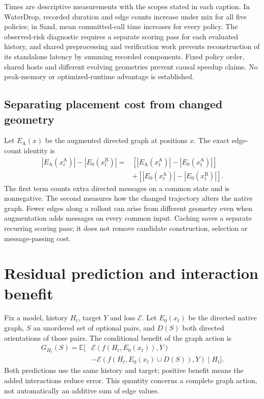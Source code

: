 Times are descriptive measurements with the scopes stated in each caption. In WaterDrop, recorded duration and edge counts increase under mix for all five policies; in Sand, mean committed-call time increases for every policy. The observed-risk diagnostic requires a separate scoring pass for each evaluated history, and shared preprocessing and verification work prevents reconstruction of its standalone latency by summing recorded components. Fixed policy order, shared hosts and different evolving geometries prevent causal speedup claims. No peak-memory or optimized-runtime advantage is established.

\subsection{Separating placement cost from changed geometry}
Let $E_{\mathrm A}(x)$ be the augmented directed graph at positions $x$. The exact edge-count identity is
\begin{align}
 |E_{\mathrm A}(x_t^{\mathrm A})|-|E_0(x_t^{\mathrm B})|
 ={}&[|E_{\mathrm A}(x_t^{\mathrm A})|-|E_0(x_t^{\mathrm A})|]\nonumber\\
 &+[|E_0(x_t^{\mathrm A})|-|E_0(x_t^{\mathrm B})|].
 \label{eq:decomposition}
\end{align}
The first term counts extra directed messages on a common state and is nonnegative. The second measures how the changed trajectory alters the native graph. Fewer edges along a rollout can arise from different geometry even when augmentation adds messages on every common input. Caching saves a separate recurring scoring pass; it does not remove candidate construction, selection or message-passing cost.

\section{Residual prediction and interaction benefit}
\label{sec:benefit-derivations}
Fix a model, history $H_t$, target $Y$ and loss $\mathcal E$. Let $E_0(x_t)$ be the directed native graph, $S$ an unordered set of optional pairs, and $D(S)$ both directed orientations of those pairs. The conditional benefit of the graph action is
\begin{align}
 G_{H_t}(S)=\mathbb E[&\mathcal E(f(H_t,E_0(x_t)),Y)\nonumber\\
              &-\mathcal E(f(H_t,E_0(x_t)\cup D(S)),Y)\mid H_t].
 \label{eq:conditional-benefit}
\end{align}
Both predictions use the same history and target; positive benefit means the added interactions reduce error. This quantity concerns a complete graph action, not automatically an additive sum of edge values.

